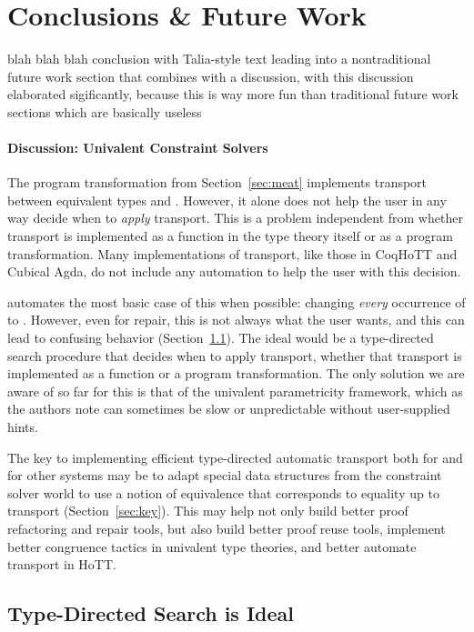 \section{Conclusions \& Future Work}
\label{sec:discussion}

blah blah blah conclusion with Talia-style text leading into a nontraditional future work section
that combines with a discussion, with this discussion elaborated sigificantly, because this is way more fun
than traditional future work sections which are basically useless

\paragraph{Discussion: Univalent Constraint Solvers}

The program transformation from Section~\ref{sec:meat} implements transport between equivalent types \A and \B.
However, it alone does not help the user in any way decide when to \textit{apply} transport.
This is a problem independent from whether transport is implemented as a function in the type theory itself
or as a program transformation.
Many implementations of transport, like those in CoqHoTT and Cubical Agda, %
do not include any automation to help the user with this decision.

\toolname automates the most basic case of this when possible: changing \textit{every} occurrence of \A to \B.
However, even for repair, this is not always what the user wants, and this can lead to confusing behavior (Section~\ref{sec:ideal}).
The ideal would be a type-directed search procedure that decides when to apply transport,
whether that transport is implemented as a function or a program transformation.
The only solution we are aware of so far for this is that of the univalent parametricity framework,
which as the authors note can sometimes be slow or unpredictable without user-supplied hints.

The key to implementing efficient type-directed automatic transport both for \toolname
and for other systems may be to adapt special data structures from the constraint solver world to use a
notion of equivalence that corresponds to equality up to transport (Section~\ref{sec:key}).
This may help not only build better proof refactoring and repair tools, but also build better proof reuse tools,
implement better congruence tactics in univalent type theories, and better automate transport in HoTT.

\subsection{Type-Directed Search is Ideal}
\label{sec:ideal}

